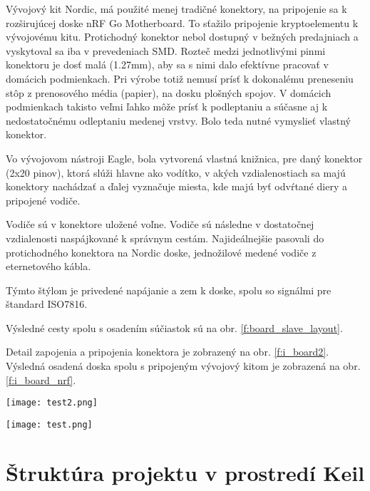 \documentclass[12pt,a4paper,oneside,openright]{report}
\begin{document}
	Vývojový kit Nordic, má použité menej tradičné konektory, na pripojenie sa k rozširujúcej doske nRF Go Motherboard. To sťažilo pripojenie kryptoelementu k vývojovému kitu. Protichodný konektor nebol dostupný v bežných predajniach a vyskytoval sa iba v prevedeniach SMD. 
	Rozteč medzi jednotlivými pinmi konektoru je dosť malá (1.27mm), aby sa s nimi dalo efektívne pracovať v domácich podmienkach. Pri výrobe totiž nemusí prísť k dokonalému preneseniu stôp z prenosového média (papier), na dosku plošných spojov. V domácich podmienkach takisto veľmi ľahko môže prísť k podleptaniu a súčasne aj k nedostatočnému odleptaniu medenej vrstvy. Bolo teda nutné vymyslieť vlastný konektor.	
	
	Vo vývojovom nástroji Eagle, bola vytvorená vlastná knižnica, pre daný konektor (2x20 pinov), ktorá slúži hlavne ako vodítko, v akých vzdialenostiach sa majú konektory nachádzať a ďalej vyznačuje miesta, kde majú byť odvŕtané diery a pripojené vodiče.
	
	Vodiče sú v konektore uložené voľne. Vodiče sú následne v dostatočnej vzdialenosti naspájkované k správnym cestám. Najideálnejšie pasovali do protichodného konektora na Nordic doske, jednožilové medené vodiče z eternetového kábla.
	
	Týmto štýlom je privedené napájanie a zem k doske, spolu so signálmi pre štandard ISO7816. 
	
	Výsledné cesty spolu s osadením súčiastok sú na obr. \ref{f:board_slave_layout}.
	
	Detail zapojenia a pripojenia konektora je zobrazený na obr. \ref{f:i_board2}.
	Výsledná osadená doska spolu s pripojeným vývojový kitom je zobrazená na obr. \ref{f:i_board_nrf}.
	
	\begin{figure*}[!htb]
		\centering
		\texttt{[image: test2.png]}
		\caption{Schéma zapojenia a pripojenia slave zariadenia s kryptoelementom.}
		\label{f:board_slave_schematic}
	\end{figure*}
	
	\begin{figure*}[!htb]
		\centering
		\texttt{[image: test.png]}
		\caption{Rozloženie súčiastok na doske plošných spojov pre slave.}
		\label{f:board_slave_layout}
	\end{figure*}

\section{Štruktúra projektu v prostredí Keil}
\end{document}
